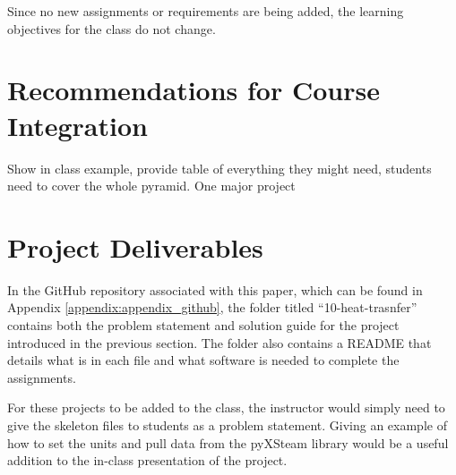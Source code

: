 Since no new assignments or requirements are being added, the learning objectives
for the class do not change. 

\section{Recommendations for Course Integration}

Show in class example, provide table of everything they might need, students need to cover
the whole pyramid. One major project

\section{Project Deliverables}

In the GitHub repository associated with this paper, which can be found in 
Appendix \ref{appendix:appendix_github}, the folder titled ``10-heat-trasnfer''
contains both the problem statement and solution guide for the project introduced in 
the previous section. The folder also contains a README that details what is in each file and 
what software is needed to complete the assignments. 

For these projects to be added to the class, the instructor would simply need to give the 
skeleton files to students as a problem statement. Giving an example of how to set the units
and pull data from the pyXSteam library would be a useful addition to the in-class presentation
of the project.
